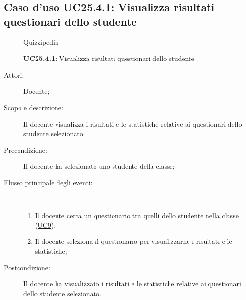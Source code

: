 \subsection{Caso d'uso UC25.4.1: Visualizza risultati questionari dello studente}
	\begin{figure}[H]
		\centering
		\begin{resizedtikzpicture}{\textwidth}
		\begin{umlsystem}[x=0, fill=lightgray!20]{Quizzipedia}
		\end{umlsystem}
		\end{resizedtikzpicture}
		\caption{\textbf{UC25.4.1}: Visualizza risultati questionari dello studente}
		\label{UC25.4.1}
	\end{figure}
\begin{description}
\item[Attori:] Docente;
\item[Scopo e descrizione:] Il docente visualizza i risultati e le statistiche relative ai questionari dello studente selezionato
      \item[Precondizione:] Il docente ha selezionato uno studente della classe;

        \item[Flusso principale degli eventi:] \ 
 \begin{enumerate}
          \item Il docente cerca un questionario tra quelli dello studente nella classe (\hyperlink{UC9}{UC9});
          \item Il docente seleziona il questionario per visualizzarne i risultati e le statistiche;

      \end{enumerate}
    \item[Postcondizione:] Il docente ha visualizzato i risultati e le statistiche relative ai questionari dello studente selezionato.
  \end{description}
\hypertarget{UC26}{}
